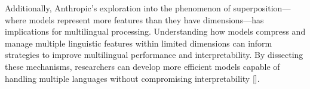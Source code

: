 Additionally, Anthropic's exploration into the phenomenon of superposition—where models represent more features than they have dimensions—has implications for multilingual processing. Understanding how models compress and manage multiple linguistic features within limited dimensions can inform strategies to improve multilingual performance and interpretability. By dissecting these mechanisms, researchers can develop more efficient models capable of handling multiple languages without compromising interpretability [\cite{elhage2022superposition}].










